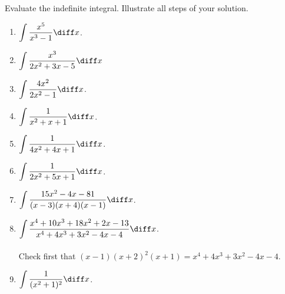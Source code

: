 Evaluate the indefinite integral. Illustrate all steps of your solution. 
\begin{multicols}{2}
\begin{enumerate}
\item $\displaystyle \int \frac{x^5 }{x^3-1}\diff x$.

\item $\displaystyle\int \frac{x^3 }{2x^2+3x-5}\diff x$ 

\item $\displaystyle\int \frac{4x^2 }{2x^2-1}\diff x$.

\item $\displaystyle\int \frac{1}{x^2+x+1}\diff x$.

\item $\displaystyle\int \frac{1}{4x^2+4x+1}\diff x$.

\item $\displaystyle\int \frac{1}{2x^2+5x+1}\diff x$.

\item $\displaystyle\int \frac{15x^2-4x-81}{ (x-3)(x +4)(x-1)}\diff x$.

\item $\displaystyle \int \frac {x^{4}+10x^{3}+ 18x^{2}+2x- 13}{x^{4} +4x^{3} +3x^{2}- 4x-4} \diff x$. 
\\~\\

Check first that $(x-1)(x+2)^2(x+1)= x^{4}+4x^{3}+3x^{2}-4x-4$. 

\item $\displaystyle \int \frac{1}{(x^2+1)^2}\diff x$.

\end{enumerate}
\end{multicols}